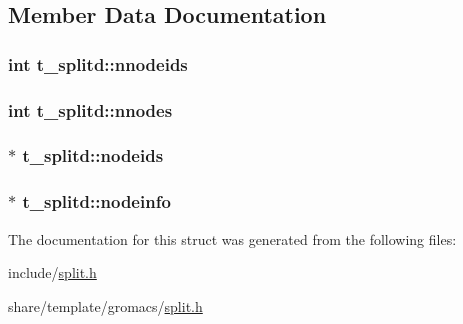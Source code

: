 \subsection{\-Member \-Data \-Documentation}
\hypertarget{structt__splitd_a9c3e3b3c74175e6e9836185ee0eb5194}{
\subsubsection[{nnodeids}]{\setlength{\rightskip}{0pt plus 5cm}int {\bf t\-\_\-splitd\-::nnodeids}}}\label{structt__splitd_a9c3e3b3c74175e6e9836185ee0eb5194}
\hypertarget{structt__splitd_a4b29e024e44b84c5b2315e71164f9a08}{
\subsubsection[{nnodes}]{\setlength{\rightskip}{0pt plus 5cm}int {\bf t\-\_\-splitd\-::nnodes}}}\label{structt__splitd_a4b29e024e44b84c5b2315e71164f9a08}
\hypertarget{structt__splitd_a6040e1fad00c2db7198f8f662fefc11f}{
\subsubsection[{nodeids}]{ $\ast$ {\bf t\-\_\-splitd\-::nodeids}}}\label{structt__splitd_a6040e1fad00c2db7198f8f662fefc11f}
\hypertarget{structt__splitd_a88368696d22668b538bc92b3275fb19c}{
\subsubsection[{nodeinfo}]{ $\ast$ {\bf t\-\_\-splitd\-::nodeinfo}}}\label{structt__splitd_a88368696d22668b538bc92b3275fb19c}


\-The documentation for this struct was generated from the following files\-:\begin{DoxyCompactItemize}
\item 
include/\hyperlink{include_2split_8h}{split.\-h}\item 
share/template/gromacs/\hyperlink{share_2template_2gromacs_2split_8h}{split.\-h}\end{DoxyCompactItemize}
